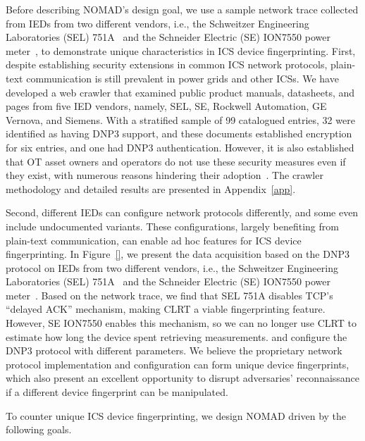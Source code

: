 \documentclass[conference]{IEEEtran}
\begin{document}
Before describing NOMAD's design goal, we use a sample network trace collected from IEDs from two different vendors, i.e., the Schweitzer Engineering Laboratories (SEL) 751A~\cite{sel751a} and the Schneider Electric (SE) ION7550 power meter~\cite{seion7550}, to demonstrate unique characteristics in ICS device fingerprinting. First, despite establishing security extensions in common ICS network protocols, plain-text communication is still prevalent in power grids and other ICSs. We have developed a web crawler that examined public product manuals, datasheets, and pages from five IED vendors, namely, SEL, SE, Rockwell Automation, GE Vernova, and Siemens. With a stratified sample of 99 catalogued entries, 32 were identified as having DNP3 support, and these documents established encryption for six entries, and one had DNP3 authentication. However, it is also established that OT asset owners and operators do not use these security measures even if they exist, with numerous reasons hindering their adoption~\cite{CISA2026SecureOT}. The crawler methodology and detailed results are presented in Appendix~\ref{app}.


Second, different IEDs can configure network protocols differently, and some even include undocumented variants. These configurations, largely benefiting from plain-text communication, can enable ad hoc features for ICS device fingerprinting. In Figure~\ref{}, we present the data acquisition based on the DNP3 protocol on IEDs from two different vendors, i.e., the Schweitzer Engineering Laboratories (SEL) 751A~\cite{sel751a} and the Schneider Electric (SE) ION7550 power meter~\cite{seion7550}. Based on the network trace, we find that SEL 751A disables TCP's ``delayed ACK'' mechanism, making CLRT a viable fingerprinting feature. However, SE ION7550 enables this mechanism, so we can no longer use CLRT to estimate how long the device spent retrieving measurements.  and configure the DNP3 protocol with different parameters. We believe the proprietary network protocol implementation and configuration can form unique device fingerprints, which also present an excellent opportunity to disrupt adversaries' reconnaissance if a different device fingerprint can be manipulated.

To counter unique ICS device fingerprinting, we design NOMAD driven by the following goals.  
\end{document}
